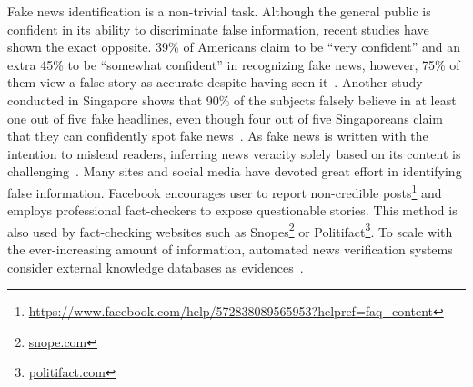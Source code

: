 \documentclass[fyp]{socreport}
\theoremstyle{definition}
\theoremstyle{hypothesis}
\begin{document}
Fake news identification is a non-trivial task. Although the general public is confident in its ability to discriminate false information, recent studies have shown the exact opposite. 39\% of Americans claim to be ``very confident'' and an extra 45\% to be ``somewhat confident'' in recognizing fake news, however, 75\% of them view a false story as accurate despite having seen it~\cite{edkins_2016}. Another study conducted in Singapore shows that 90\% of the subjects falsely believe in at least one out of five fake headlines, even though four out of five Singaporeans claim that they can confidently spot fake news~\cite{ng_2018}. As fake news is written with the intention to mislead readers, inferring news veracity solely based on its content is challenging~\cite{shu2017fake}. Many sites and social media have devoted great effort in identifying false information. Facebook encourages user to report non-credible posts\footnote{\scriptsize{\url{https://www.facebook.com/help/572838089565953?helpref=faq_content}}} and employs professional fact-checkers to expose questionable stories. This method is also used by fact-checking websites such as Snopes\footnote{\scriptsize{\url{snope.com}}} or Politifact\footnote{\scriptsize{\url{politifact.com}}}. To scale with the ever-increasing amount of information, automated news verification systems consider external knowledge databases as evidences~\cite{hassan2017claimbuster,thorne2017extensible}. 
\end{document}
